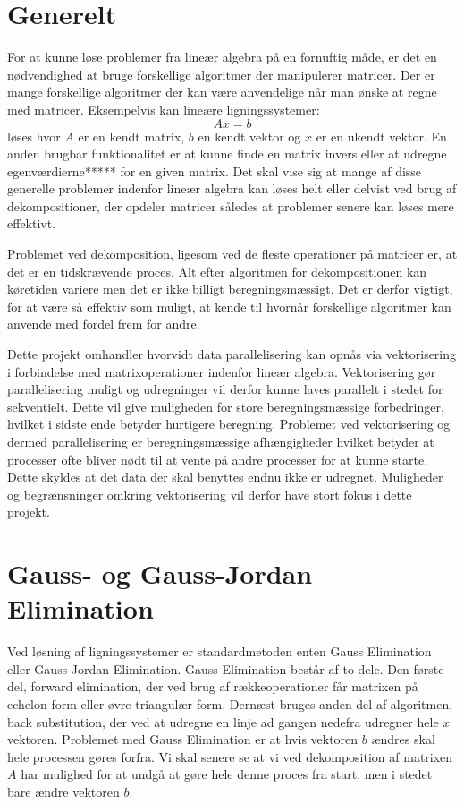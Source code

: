 \documentclass{article}
\begin{document}
\section{Generelt}
For at kunne løse problemer fra lineær algebra på en fornuftig måde, er det en nødvendighed at bruge forskellige algoritmer der manipulerer matricer. Der er mange forskellige algoritmer der kan være anvendelige når man ønske at regne med matricer. Eksempelvis kan lineære ligningssystemer: $$Ax=b$$
løses hvor $A$ er en kendt matrix, $b$ en kendt vektor og $x$ er en ukendt vektor.
En anden brugbar funktionalitet er at kunne finde en matrix invers eller at udregne egenværdierne***** for en given matrix. Det skal vise sig at mange af disse generelle problemer indenfor lineær algebra kan løses helt eller delvist ved brug af dekompositioner, der opdeler matricer således at problemer senere kan løses mere effektivt.

Problemet ved dekomposition, ligesom ved de fleste operationer på matricer er, at det er en tidskrævende proces. Alt efter algoritmen for dekompositionen kan køretiden variere men det er ikke billigt beregningsmæssigt. Det er derfor vigtigt, for at være så effektiv som muligt, at kende til hvornår forskellige algoritmer kan anvende med fordel frem for andre.\newline

Dette projekt omhandler hvorvidt data parallelisering kan opnås via vektorisering i forbindelse med matrixoperationer indenfor lineær algebra. Vektorisering gør parallelisering muligt og udregninger vil derfor kunne laves parallelt i stedet for sekventielt. Dette vil give muligheden for store beregningsmæssige forbedringer, hvilket i sidste ende betyder hurtigere beregning. Problemet ved vektorisering og dermed parallelisering er beregningsmæssige afhængigheder hvilket betyder at processer ofte bliver nødt til at vente på andre processer for at kunne starte. Dette skyldes at det data der skal benyttes endnu ikke er udregnet. Muligheder og begrænsninger omkring vektorisering vil derfor have stort fokus i dette projekt. 


\section{Gauss- og Gauss-Jordan Elimination}
Ved løsning af ligningssystemer er standardmetoden enten Gauss Elimination eller Gauss-Jordan Elimination.
Gauss Elimination består af to dele. Den første del, forward elimination, der ved brug af rækkeoperationer får matrixen på echelon form eller øvre triangulær form. Dernæst bruges anden del af algoritmen, back substitution, der ved at udregne en linje ad gangen nedefra udregner hele $x$ vektoren. Problemet med Gauss Elimination er at hvis vektoren $b$ ændres skal hele processen gøres forfra. Vi skal senere se at vi ved dekomposition af matrixen $A$ har mulighed for at undgå at gøre hele denne proces fra start, men i stedet bare ændre vektoren $b$. \newline
\end{document}
